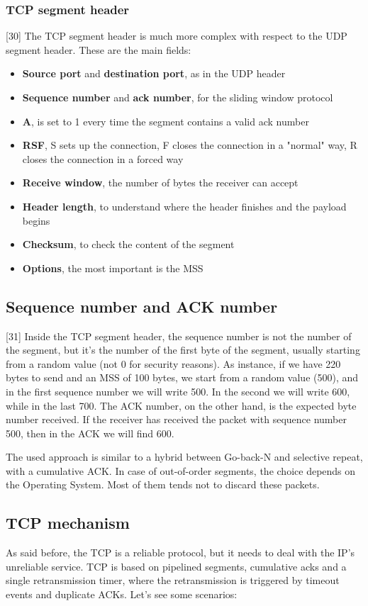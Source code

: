 \subsubsection{TCP segment header}
[30] The TCP segment header is much more complex with respect to the UDP segment header. These are the main fields:
\begin{itemize}
    \item \textbf{Source port} and \textbf{destination port}, as in the UDP header
    \item \textbf{Sequence number} and \textbf{ack number}, for the sliding window protocol
    \item \textbf{A}, is set to 1 every time the segment contains a valid ack number
    \item \textbf{RSF}, S sets up the connection, F closes the connection in a "normal" way, R closes the connection in a forced way
    \item \textbf{Receive window}, the number of bytes the receiver can accept
    \item \textbf{Header length}, to understand where the header finishes and the payload begins
    \item \textbf{Checksum}, to check the content of the segment
    \item \textbf{Options}, the most important is the MSS
\end{itemize}

\subsection{Sequence number and ACK number}
[31] Inside the TCP segment header, the sequence number is not the number of the segment, but it's the number of the first byte of the segment, usually starting from a random value (not 0 for security reasons). As instance, if we have 220 bytes to send and an MSS of 100 bytes, we start from a random value (500), and in the first sequence number we will write 500. In the second we will write 600, while in the last 700. The ACK number, on the other hand, is the expected byte number received. If the receiver has received the packet with sequence number 500, then in the ACK we will find 600.

The used approach is similar to a hybrid between Go-back-N and selective repeat, with a cumulative ACK. In case of out-of-order segments, the choice depends on the Operating System. Most of them tends not to discard these packets.

\subsection{TCP mechanism}
As said before, the TCP is a reliable protocol, but it needs to deal with the IP's unreliable service. TCP is based on pipelined segments, cumulative acks and a single retransmission timer, where the retransmission is triggered by timeout events and duplicate ACKs. Let's see some scenarios:

